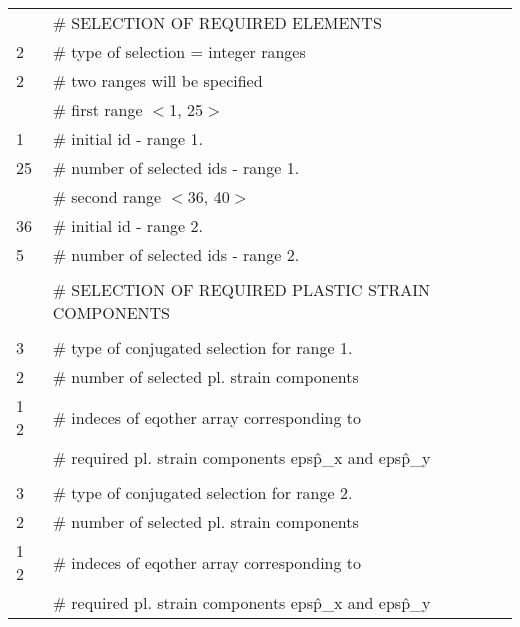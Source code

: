 \begin{center}
\begin{tabular}{|ll|}
\hline
     & \# SELECTION OF REQUIRED ELEMENTS                    \\
2    & \# type of selection = integer ranges                \\
2    & \# two ranges will be specified                      \\
     & \# first range $<$1, 25$>$                           \\
1    & \# initial id - range 1.                             \\
25   & \# number of selected ids - range 1.                 \\
     & \# second range $<$36, 40$>$                         \\
36   & \# initial id - range 2.                             \\
5    & \# number of selected ids - range 2.                 \\
     &                                                      \\
     & \# SELECTION OF REQUIRED PLASTIC STRAIN COMPONENTS   \\
     &                                                      \\
3    & \# type of conjugated selection for range 1.         \\
2    & \# number of selected pl. strain components          \\
1 2  & \# indeces of eqother array corresponding to         \\
     & \# required pl. strain components eps\^p\_x and eps\^p\_y\\      
     &                                                      \\
3    & \# type of conjugated selection for range 2.         \\
2    & \# number of selected pl. strain components          \\
1 2  & \# indeces of eqother array corresponding to         \\
     & \# required pl. strain components eps\^p\_x and eps\^p\_y\\      
\hline
\end{tabular}\\
\end{center}

